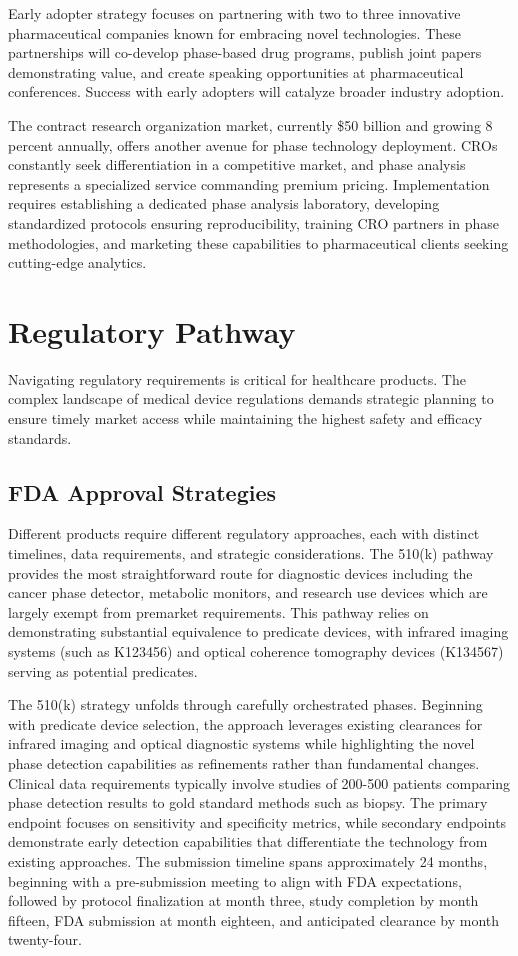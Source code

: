 \documentclass[12pt,a4paper]{report}
\begin{document}
Early adopter strategy focuses on partnering with two to three innovative pharmaceutical companies known for embracing novel technologies. These partnerships will co-develop phase-based drug programs, publish joint papers demonstrating value, and create speaking opportunities at pharmaceutical conferences. Success with early adopters will catalyze broader industry adoption.

The contract research organization market, currently \$50 billion and growing 8 percent annually, offers another avenue for phase technology deployment. CROs constantly seek differentiation in a competitive market, and phase analysis represents a specialized service commanding premium pricing. Implementation requires establishing a dedicated phase analysis laboratory, developing standardized protocols ensuring reproducibility, training CRO partners in phase methodologies, and marketing these capabilities to pharmaceutical clients seeking cutting-edge analytics.

\section{Regulatory Pathway}

Navigating regulatory requirements is critical for healthcare products. The complex landscape of medical device regulations demands strategic planning to ensure timely market access while maintaining the highest safety and efficacy standards.

\subsection{FDA Approval Strategies}

Different products require different regulatory approaches, each with distinct timelines, data requirements, and strategic considerations. The 510(k) pathway provides the most straightforward route for diagnostic devices including the cancer phase detector, metabolic monitors, and research use devices which are largely exempt from premarket requirements. This pathway relies on demonstrating substantial equivalence to predicate devices, with infrared imaging systems (such as K123456) and optical coherence tomography devices (K134567) serving as potential predicates.

The 510(k) strategy unfolds through carefully orchestrated phases. Beginning with predicate device selection, the approach leverages existing clearances for infrared imaging and optical diagnostic systems while highlighting the novel phase detection capabilities as refinements rather than fundamental changes. Clinical data requirements typically involve studies of 200-500 patients comparing phase detection results to gold standard methods such as biopsy. The primary endpoint focuses on sensitivity and specificity metrics, while secondary endpoints demonstrate early detection capabilities that differentiate the technology from existing approaches. The submission timeline spans approximately 24 months, beginning with a pre-submission meeting to align with FDA expectations, followed by protocol finalization at month three, study completion by month fifteen, FDA submission at month eighteen, and anticipated clearance by month twenty-four.
\end{document}

